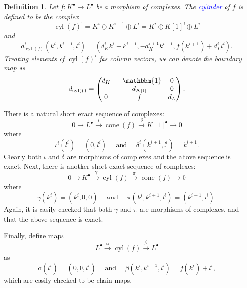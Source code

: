 \documentclass[11pt]{article}
\theoremstyle{thmstyle}
\theoremstyle{defstyle}
\newtheorem{definition}[theorem]{Definition}
\newcommand{\define}[1]{\textcolor{blue}{\textit{#1}}}
\newcommand{\cone}{\operatorname{cone}}
\newcommand{\cyl}{\operatorname{cyl}}
\newcommand{\bbone}{\mathbbm{1}}
\begin{document}
\begin{definition}
	Let $f\colon K^\bullet\to L^\bullet$ be a morphism of complexes. The \define{cylinder} of $f$ is defined to be the complex 
	\begin{equation*}
		\cyl(f)^i = K^i\oplus K^{i + 1}\oplus L^i = K^i\oplus K[1]^i\oplus L^i
	\end{equation*}
	and 
	\begin{equation*}
		d_{\cyl(f)}^i\left(k^i, k^{i + 1}, l^i\right) = \left(d_K^i k^i - k^{i + 1}, -d_K^{i + 1}k^{i + 1}, f(k^{i + 1}) + d_L^i l^i\right).
	\end{equation*}
	Treating elements of $\cyl(f)^i$ fas column vectors, we can denote the boundary map as 
	\begin{equation*}
		d_{\cyl(f)} = 
		\begin{pmatrix}
			d_K & -\bbone & 0\\
			& d_{K[1]} & 0\\
			0 & f & d_L
		\end{pmatrix}.
	\end{equation*}
\end{definition}

There is a natural short exact sequence of complexes:
\begin{equation*}
	0\to L^\bullet\xrightarrow{\iota} \cone(f)\xrightarrow{\delta} K[1]^\bullet\to 0
\end{equation*}
where 
\begin{equation*}
	\iota^i(l^i) = \left(0, l^i\right)\quad\text{ and }\quad\delta^i\left(k^{i + 1}, l^i\right) = k^{i + 1}.
\end{equation*}
Clearly both $\iota$ and $\delta$ are morphisms of complexes and the above sequence is exact. Next, there is another short exact sequence of complexes: 
\begin{equation*}
	0\to K^\bullet\xrightarrow{\gamma}\cyl(f)\xrightarrow{\pi}\cone(f)\to 0
\end{equation*}
where 
\begin{equation*}
	\gamma(k^i) = \left(k^i, 0, 0\right)\quad\text{ and }\quad \pi(k^i, k^{i + 1}, l^i) = \left(k^{i + 1}, l^i\right).
\end{equation*}
Again, it is easily checked that both $\gamma$ and $\pi$ are morphisms of complexes, and that the above sequence is exact.

Finally, define maps 
\begin{equation*}
	L^\bullet\xrightarrow{\alpha}\cyl(f)\xrightarrow{\beta} L^\bullet
\end{equation*}
as 
\begin{equation*}
	\alpha\left(l^i\right) = \left(0, 0, l^i\right)\quad\text{ and }\quad \beta\left(k^i, k^{i + 1}, l^i\right) = f(k^i) + l^i,
\end{equation*}
which are easily checked to be chain maps.
\end{document}
